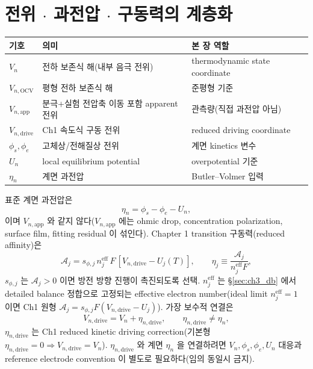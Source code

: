 \documentclass[11pt,a4paper]{article}
\newcommand{\eff}{\mathrm{eff}}
\newcommand{\app}{\mathrm{app}}
\newcommand{\drive}{\mathrm{drive}}
\newcommand{\OCV}{\mathrm{OCV}}
\begin{document}
\section{전위 $\cdot$ 과전압 $\cdot$ 구동력의 계층화}\label{sec:ch3_potentials}
\begin{longtable}{p{} p{} p{}}
\toprule 기호 & 의미 & 본 장 역할 \\ \midrule \endhead
$V_n$ & 전하 보존식 해(내부 음극 전위) & thermodynamic state coordinate \\
$V_{n,\OCV}$ & 평형 전하 보존식 해 & 준평형 기준 \\
$V_{n,\app}$ & 분극+실험 전압축 이동 포함 apparent 전위 & 관측량(직접 과전압 아님) \\
$V_{n,\drive}$ & Ch1 속도식 구동 전위 & reduced driving coordinate \\
$\phi_s,\phi_e$ & 고체상/전해질상 전위 & 계면 kinetics 변수 \\
$U_n$ & local equilibrium potential & overpotential 기준 \\
$\eta_n$ & 계면 과전압 & Butler--Volmer 입력 \\
\bottomrule
\end{longtable}
표준 계면 과전압은
\begin{equation}
\eta_n=\phi_s-\phi_e-U_n,
\label{eq:ch3_eta_standard}
\end{equation}
이며 $V_{n,\app}$ 와 같지 않다($V_{n,\app}$ 에는 ohmic drop, concentration polarization, surface film,
fitting residual 이 섞인다). Chapter 1 transition 구동력(reduced affinity)은
\begin{equation}
\mathcal A_j=s_{\phi,j}\,n_j^{\eff}\,F\,[V_{n,\drive}-U_j(T)],\qquad \eta_j\equiv\frac{\mathcal A_j}{n_j^{\eff}F},
\label{eq:ch3_Aj}
\end{equation}
$s_{\phi,j}$ 는 $\mathcal A_j>0$ 이면 방전 방향 진행이 촉진되도록 선택. $n_j^{\eff}$ 는 \S\ref{sec:ch3_db}
에서 detailed balance 정합으로 고정되는 effective electron number(ideal limit $n_j^{\eff}=1$ 이면 Ch1
원형 $\mathcal A_j=s_{\phi,j}F(V_{n,\drive}-U_j)$). 가장 보수적 연결은
\begin{equation}
V_{n,\drive}=V_n+\eta_{n,\drive},\qquad \eta_{n,\drive}\ne\eta_n,
\label{eq:ch3_drive}
\end{equation}
$\eta_{n,\drive}$ 는 Ch1 reduced kinetic driving correction(기본형 $\eta_{n,\drive}=0\Rightarrow V_{n,\drive}=V_n$).
$\eta_{n,\drive}$ 와 계면 $\eta_n$ 을 연결하려면 $V_n,\phi_s,\phi_e,U_n$ 대응과 reference electrode
convention 이 별도로 필요하다(임의 동일시 금지).
\end{document}
